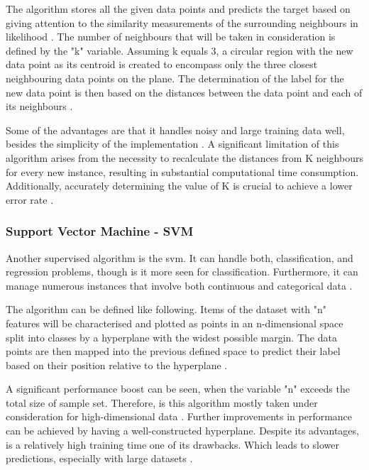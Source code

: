 The algorithm stores all the given data points and predicts the target based on giving attention to the similarity measurements of the surrounding neighbours in likelihood \citep{sen_supervised_2020}. The number of neighbours that will be taken in consideration is defined by the "k" variable. Assuming k equals 3, a circular region with the new data point as its centroid is created to encompass only the three closest neighbouring data points on the plane. The determination of the label for the new data point is then based on the distances between the data point and each of its neighbours \citep{sen_supervised_2020}.

Some of the advantages are that it handles noisy and large training data well, besides the simplicity of the implementation \citep{sen_supervised_2020}. A significant limitation of this algorithm arises from the necessity to recalculate the distances from K neighbours for every new instance, resulting in substantial computational time consumption. Additionally, accurately determining the value of K is crucial to achieve a lower error rate \citep{sen_supervised_2020}.

\subsubsection{Support Vector Machine - SVM}
Another supervised algorithm is the \ac{svm}. It can handle both, classification, and regression problems, though is it more seen for classification. Furthermore, it can manage numerous instances that involve both continuous and categorical data \citep{sen_supervised_2020}.

The algorithm can be defined like following. Items of the dataset with "n" features will be characterised and plotted as points in an n-dimensional space split into classes by a hyperplane with the widest possible margin. The data points are then mapped into the previous defined space to predict their label based on their position relative to the hyperplane \citep{sen_supervised_2020}.

A significant performance boost can be seen, when the variable "n" exceeds the total size of sample set. Therefore, is this algorithm mostly taken under consideration for high-dimensional data \citep{sen_supervised_2020}. Further improvements in performance can be achieved by having a well-constructed hyperplane. Despite its advantages, is a relatively high training time one of its drawbacks. Which leads to slower predictions, especially with large datasets \citep{sen_supervised_2020}.

